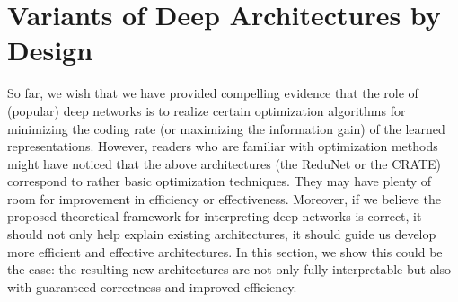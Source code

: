 \documentclass[../../book-main.tex]{subfiles}
\begin{document}
\begin{table*}[t!]
\centering
\caption{\small Top-1 classification accuracy of \textsc{crate} on various datasets with different model scales 
when pre-trained on ImageNet-1K. For ImageNet-1K/ImageNet-1K ReaL, we directly evaluate the top-1 accuracy. For other datasets, we use models that are pre-trained on ImageNet as initialization and the evaluate the transfer learning performance via fine-tuning.}
\label{tab:crate_comparison_with_sota}
\small
    \setlength{\tabcolsep}{13.6pt}
\end{table*}



\section{Variants of Deep Architectures by Design} \label{sec:chap4-derive-white-box-transformer-variants}

So far, we wish that we have provided compelling evidence that the role of (popular) deep networks is to realize certain optimization algorithms for minimizing the coding rate (or maximizing the information gain) of the learned representations. However, readers who are familiar with optimization methods might have noticed that the above architectures (the ReduNet or the CRATE) correspond to rather basic optimization techniques. They may have plenty of room for improvement in efficiency or effectiveness. Moreover, if we believe the proposed theoretical framework for interpreting deep networks is correct, it should not only help explain existing architectures, it should guide us develop more efficient and effective architectures. In this section, we show this could be the case: the resulting new architectures are not only fully interpretable but also with guaranteed correctness and improved efficiency. 
\end{document}
